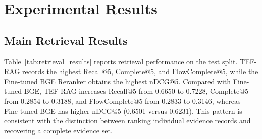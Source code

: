 \section{Experimental Results}
\label{sec:results}

\subsection{Main Retrieval Results}

Table~\ref{tab:retrieval_results} reports retrieval performance on the test split.
TEF-RAG records the highest Recall@5, Complete@5, and FlowComplete@5, while the Fine-tuned BGE Reranker obtains the highest nDCG@5. Compared with Fine-tuned BGE, TEF-RAG increases Recall@5 from 0.6650 to 0.7228, Complete@5 from 0.2854 to 0.3188, and FlowComplete@5 from 0.2833 to 0.3146, whereas Fine-tuned BGE has higher nDCG@5 (0.6501 versus 0.6231). This pattern is consistent with the distinction between ranking individual evidence records and recovering a complete evidence set.

\begin{table}[t]
\caption{Main retrieval results on the test split (Top-5).}
\label{tab:retrieval_results}
\centering
\small
\setlength{\tabcolsep}{3pt}
\end{table}

